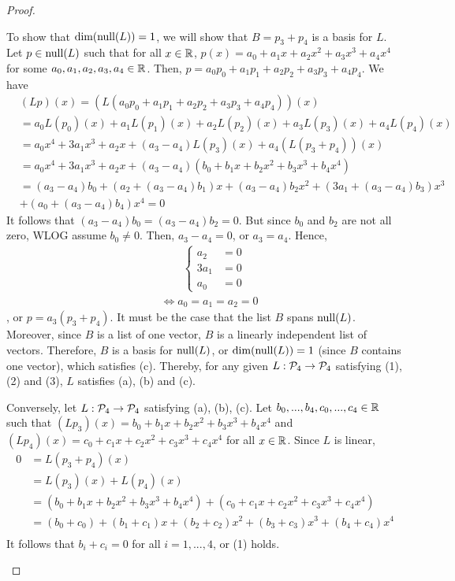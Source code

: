 \begin{proof}
\begin{enumerate}[(i)]
        To show that $\dim(\nullla(L))=1$, we will show that $B=p_3+p_4$ is a basis for $L$.
        Let $p\in\nullla(L)$ such that for all $x\in\R$, $p(x)=a_0+a_1x+a_2x^2+a_3x^3+a_4x^4$ for some $a_0,a_1,a_2,a_3,a_4\in\R$.
        Then, $p=a_0p_0+a_1p_1+a_2p_2+a_3p_3+a_4p_4$. 
        We have 
        \[
            \begin{aligned}
                &(Lp)(x)=(L(a_0p_0+a_1p_1+a_2p_2+a_3p_3+a_4p_4))(x)\\
                &= a_0L(p_0)(x)+a_1L(p_1)(x)+a_2L(p_2)(x)+a_3L(p_3)(x)+a_4L(p_4)(x)\\
                &= a_0x^4+3a_1x^3+a_2x+(a_3-a_4)L(p_3)(x)+a_4(L(p_3+p_4))(x)\\
                &= a_0x^4+3a_1x^3+a_2x+(a_3-a_4)(b_0+b_1x+b_2x^2+b_3x^3+b_4x^4)\\
                &= (a_3-a_4)b_0+(a_2+(a_3-a_4)b_1)x+(a_3-a_4)b_2x^2+(3a_1+(a_3-a_4)b_3)x^3\\
                & +(a_0+(a_3-a_4)b_4)x^4=0
            \end{aligned}
        \]
        It follows that $(a_3-a_4)b_0=(a_3-a_4)b_2=0$. But since $b_0$ and $b_2$ are not all zero, WLOG assume $b_0\not=0$.
        Then, $a_3-a_4=0$, or $a_3=a_4$.
        Hence,
        \begin{align*}
            &\qquad\begin{cases}
                a_2 &= 0\\
                3a_1 &= 0\\
                a_0 &= 0
            \end{cases}\\
            &\iff a_0=a_1=a_2=0
        \end{align*}
        , or $p=a_3(p_3+p_4)$. It must be the case that the list $B$ spans $\nullla(L)$.
        Moreover, since $B$ is a list of one vector, $B$ is a linearly independent list of vectors.
        Therefore, $B$ is a basis for $\nullla(L)$, or $\dim(\nullla(L))=1$ (since $B$ contains one vector), which satisfies (c).
        Thereby, for any given $L:\P_4\rightarrow\P_4$ satisfying (1), (2) and (3), $L$ satisfies (a), (b) and (c).

        Conversely, let $L:\P_4\rightarrow\P_4$ satisfying (a), (b), (c). 
        Let $b_0,...,b_4,c_0,...,c_4\in\R$ such that $(Lp_3)(x)=b_0+b_1x+b_2x^2+b_3x^3+b_4x^4$ and $(Lp_4)(x)=c_0+c_1x+c_2x^2+c_3x^3+c_4x^4$ for all $x\in\R$.
        Since $L$ is linear, 
        \[
            \begin{aligned}
                0&= L(p_3+p_4)(x)\\
                &= L(p_3)(x)+L(p_4)(x)\\
                &= (b_0+b_1x+b_2x^2+b_3x^3+b_4x^4)+(c_0+c_1x+c_2x^2+c_3x^3+c_4x^4)\\
                &= (b_0+c_0)+(b_1+c_1)x+(b_2+c_2)x^2+(b_3+c_3)x^3+(b_4+c_4)x^4\\
            \end{aligned}
        \]
        It follows that $b_i+c_i=0$ for all $i=1,...,4$, or (1) holds.


\end{enumerate}
\end{proof}
